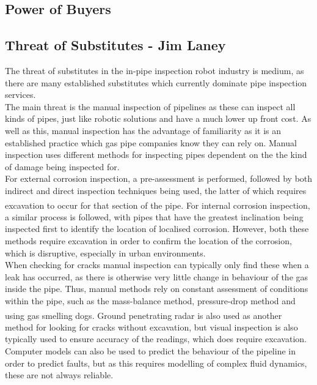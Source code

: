 \documentclass[11pt]{article}		%
\newcommand{\supercite}[1]{\textsuperscript{\cite{#1}}}		%
\begin{document}
		\subsection[Power of Buyers]{Power of Buyers}
		
		\subsection[Threat of Substitutes]{Threat of Substitutes - Jim Laney}
			
			The threat of substitutes in the in-pipe inspection robot industry is medium, as there are many established substitutes which currently dominate pipe inspection services.
			\\
			The main threat is the manual inspection of pipelines as these can inspect all kinds of pipes, just like robotic solutions and have a much lower up front cost.
			As well as this, manual inspection has the advantage of familiarity as it is an established practice which gas pipe companies know they can rely on.
			Manual inspection uses different methods for inspecting pipes dependent on the the kind of damage being inspected for.
			\\
			For external corrosion inspection, a pre-assessment is performed, followed by both indirect and direct inspection techniques being used, the latter of which requires excavation to occur for that section of the pipe\supercite{kishawy2010review}. 
			For internal corrosion inspection, a similar process is followed, with pipes that have the greatest inclination being inspected first to identify the location of localised corrosion. 
			However, both these methods require excavation in order to confirm the location of the corrosion, which is disruptive, especially in urban environments.
			\\
			When checking for cracks manual inspection can typically only find these when a leak has occurred, as there is otherwise very little change in behaviour of the gas inside the pipe.
			Thus, manual methods rely on constant assessment of conditions within the pipe, such as the mass-balance method, pressure-drop method and using gas smelling dogs\supercite{kishawy2010review}.
			Ground penetrating radar is also used as another method for looking for cracks without excavation, but visual inspection is also typically used to ensure accuracy of the readings, which does require excavation.
			Computer models can also be used to predict the behaviour of the pipeline in order to predict faults, but as this requires modelling of complex fluid dynamics, these are not always reliable.
\end{document}

